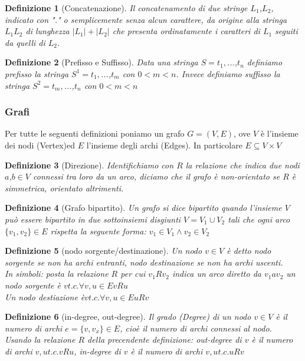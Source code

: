 \documentclass[a4paper]{article}
\newtheorem*{definition}{Definizione}
\begin{document}
\begin{definition}[Concatenazione] Il concatenamento di due stringe $L_1$,$L_2$, indicato con "." o semplicemente senza alcun carattere, da origine alla stringa $L_1L_2$ di lunghezza $|L_1| + |L_2|$ che presenta ordinatamente i caratteri di $L_1$ seguiti da quelli di $L_2$.
\end{definition}

\begin{definition}[Prefisso e Suffisso]Data una stringa $S = t_1,$...,$t_n$ definiamo prefisso la stringa $S^1 = t_1,$...,$t_m$ con $ 0 < m < n$. Invece definiamo suffisso la stringa $S^2 = t_m,$...,$t_n$ con $ 0 < m < n$ 
\end{definition}


\subsubsection{Grafi}

Per tutte le seguenti definizioni poniamo un grafo $G =(V, E)$, ove $V$ è l'insieme dei nodi (Vertex)ed $E$ l'insieme degli archi (Edges). In particolare $E \subseteq V\times V$  
\begin{definition}[Direzione]Identifichiamo con $R$ la relazione che indica due nodi $a$,$b$$\in V$ connessi tra loro da un arco, diciamo che il grafo è non-orientato se $R$ è simmetrica, orientato altrimenti.
\end{definition}

\begin{definition}[Grafo bipartito]Un grafo si dice bipartito quando l'insieme $V$ può essere bipartito in due sottoinsiemi disgiunti $V=V_1\cup V_2$ tali che ogni arco $\{v_1,v_2\} \in E$ rispetta la seguente forma: $v_1 \in V_1 \land v_2 \in V_2$
\end{definition}

\begin{definition}[nodo sorgente/destinazione]Un nodo $v \in V$ è detto nodo sorgente se non ha archi entranti, nodo destinazione se non ha archi uscenti.\\
In simboli: posta la relazione $R$ per cui $v_1Rv_2$ indica un arco diretto da $v_1 a v_2$ un nodo sorgente è $v t.c. \forall {v,u} \in E vRu$\\
Un nodo destiazione è$v t.c. \forall {v,u} \in E uRv$
\end{definition}

\begin{definition}[in-degree, out-degree]Il grado (Degree) di un nodo $v \in V$ è il numero di archi $e = \{v,v_x\}\in E$, cioè il numero di archi connessi al nodo.\\
Usando la relazione $R$ della precendente definizione: out-degree di $v$ è il numero di archi ${v,u} t.c. vRu$, in-degree di $v$ è il numero di archi ${v,u} t.c. uRv$
\end{definition}
\end{document}

